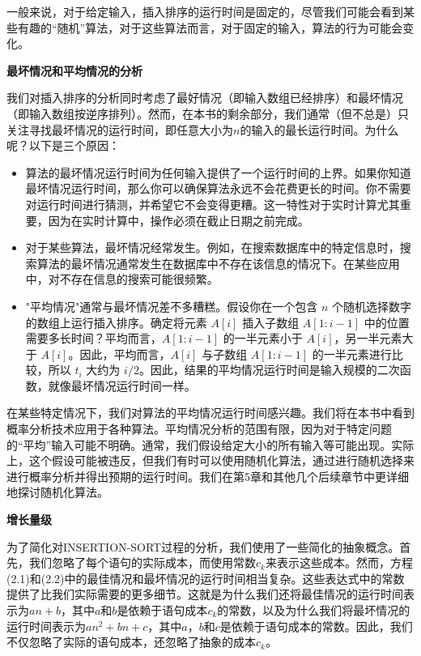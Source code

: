\documentclass[lang=cn,newtx,10pt,scheme=chinese]{elegantbook}
\begin{document}
一般来说，对于给定输入，插入排序的运行时间是固定的，尽管我们可能会看到某些有趣的``随机''算法，对于这些算法而言，对于固定的输入，算法的行为可能会变化。

\textbf{最坏情况和平均情况的分析}

我们对插入排序的分析同时考虑了最好情况（即输入数组已经排序）和最坏情况（即输入数组按逆序排列）。然而，在本书的剩余部分，我们通常（但不总是）只关注寻找最坏情况的运行时间，即任意大小为$n$的输入的最长运行时间。为什么呢？以下是三个原因：

\begin{itemize}
    \item 算法的最坏情况运行时间为任何输入提供了一个运行时间的上界。如果你知道最坏情况运行时间，那么你可以确保算法永远不会花费更长的时间。你不需要对运行时间进行猜测，并希望它不会变得更糟。这一特性对于实时计算尤其重要，因为在实时计算中，操作必须在截止日期之前完成。
    \item 对于某些算法，最坏情况经常发生。例如，在搜索数据库中的特定信息时，搜索算法的最坏情况通常发生在数据库中不存在该信息的情况下。在某些应用中，对不存在信息的搜索可能很频繁。
    \item "平均情况"通常与最坏情况差不多糟糕。假设你在一个包含 $n$ 个随机选择数字的数组上运行插入排序。确定将元素 $A[i]$ 插入子数组 $A[1:i-1]$ 中的位置需要多长时间？平均而言，$A[1:i-1]$ 的一半元素小于 $A[i]$，另一半元素大于 $A[i]$。因此，平均而言，$A[i]$ 与子数组 $A[1:i-1]$ 的一半元素进行比较，所以 $t_i$ 大约为 $i/2$。因此，结果的平均情况运行时间是输入规模的二次函数，就像最坏情况运行时间一样。
\end{itemize}

在某些特定情况下，我们对算法的平均情况运行时间感兴趣。我们将在本书中看到概率分析技术应用于各种算法。平均情况分析的范围有限，因为对于特定问题的“平均”输入可能不明确。通常，我们假设给定大小的所有输入等可能出现。实际上，这个假设可能被违反，但我们有时可以使用随机化算法，通过进行随机选择来进行概率分析并得出预期的运行时间。我们在第5章和其他几个后续章节中更详细地探讨随机化算法。

\textbf{增长量级}

为了简化对INSERTION-SORT过程的分析，我们使用了一些简化的抽象概念。首先，我们忽略了每个语句的实际成本，而使用常数$c_k$来表示这些成本。然而，方程(2.1)和(2.2)中的最佳情况和最坏情况的运行时间相当复杂。这些表达式中的常数提供了比我们实际需要的更多细节。这就是为什么我们还将最佳情况的运行时间表示为$an+b$，其中$a$和$b$是依赖于语句成本$c_k$的常数，以及为什么我们将最坏情况的运行时间表示为$an^2+bn+c$，其中$a$，$b$和$c$是依赖于语句成本的常数。因此，我们不仅忽略了实际的语句成本，还忽略了抽象的成本$c_k$。
\end{document}
